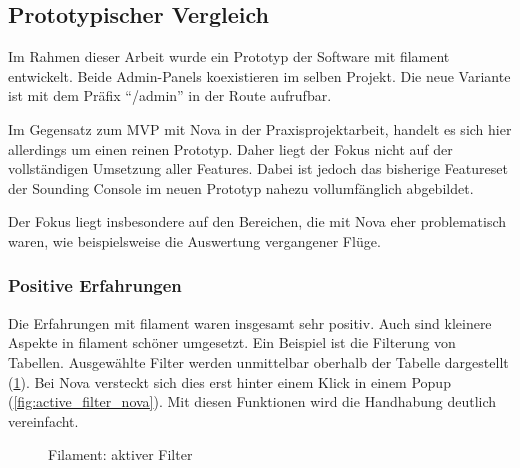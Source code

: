 \subsection{Prototypischer Vergleich}
Im Rahmen dieser Arbeit wurde ein Prototyp der Software mit filament entwickelt.
Beide Admin-Panels koexistieren im selben Projekt.
Die neue Variante ist mit dem Präfix \enquote{/admin} in der Route aufrufbar.

Im Gegensatz zum MVP mit Nova in der Praxisprojektarbeit, handelt es sich hier allerdings um einen reinen Prototyp.
Daher liegt der Fokus nicht auf der vollständigen Umsetzung aller Features.
Dabei ist jedoch das bisherige Featureset der Sounding Console im neuen Prototyp nahezu vollumfänglich abgebildet.

Der Fokus liegt insbesondere auf den Bereichen, die mit Nova eher problematisch waren, wie beispielsweise die Auswertung vergangener Flüge.

\subsubsection{Positive Erfahrungen}
Die Erfahrungen mit filament waren insgesamt sehr positiv.
Auch sind kleinere Aspekte in filament schöner umgesetzt.
Ein Beispiel ist die Filterung von Tabellen.
Ausgewählte Filter werden unmittelbar oberhalb der Tabelle dargestellt (\ref{fig:active_filter_filament}).
Bei Nova versteckt sich dies erst hinter einem Klick in einem Popup (\ref{fig:active_filter_nova}).
Mit diesen Funktionen wird die Handhabung deutlich vereinfacht.

\color{lightgray}
\begin{figure}[h!]
    \centering
    \caption{Filament: aktiver Filter}
    \label{fig:active_filter_filament}
\end{figure}

